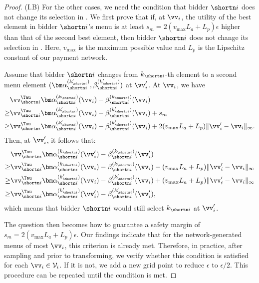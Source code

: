 \begin{proof}
(I.B) For the other cases, we need the condition that bidder $\shortn i$ does not change its selection in \neighbor. We first prove that if, at $\vv_i$, the utility of the best element in bidder $\shortn i$'s menu is at least $s_m=2(v_{\max}L_a + L_p)\epsilon$ higher than that of the second best element, then bidder $\shortn i$ does not change its selection in \neighbor. Here, $v_{\max}$ is the maximum possible value and $L_p$ is the Lipschitz constant of our payment network. 

Assume that bidder $\shortn i$ changes from $k_{\shortn i}$-th element to a second menu element $(\bm\alpha_{\shortn i}^{(k_{\shortn i}')}, \beta_{\shortn i}^{(k_{\shortn i}')})$ at $\vv_i'$. At $\vv_i$, we have
\begin{align}
    &\vv_{\shortn i}^\Tau \bm\alpha_{\shortn i}^{(k_{\shortn i})}(\vv_i) - \beta_{\shortn i}^{(k_{\shortn i})}(\vv_i) \nonumber\\
    \ge &\vv_{\shortn i}^\Tau \bm\alpha_{\shortn i}^{(k_{\shortn i}')}(\vv_i) - \beta_{\shortn i}^{(k_{\shortn i}')}(\vv_i) + s_m \\
    \ge &\vv_{\shortn i}^\Tau \bm\alpha_{\shortn i}^{(k_{\shortn i}')}(\vv_i) - \beta_{\shortn i}^{(k_{\shortn i}')}(\vv_i) + 2(v_{\max}L_a + L_p)\|\vv_i'-\vv_i\|_\infty.\label{equ:case22-1}\nonumber
\end{align}
Then, at $\vv_i'$, it follows that:
\begin{align}
    & \vv_{\shortn i}^\Tau \bm\alpha_{\shortn i}^{(k_{\shortn i})}(\vv_i') - \beta_{\shortn i}^{(k_{\shortn i})}(\vv_i') \\
    \ge & \vv_{\shortn i}^\Tau \bm\alpha_{\shortn i}^{(k_{\shortn i})}(\vv_i) - \beta_{\shortn i}^{(k_{\shortn i})}(\vv_i) - (v_{\max}L_a + L_p)\|\vv_i'-\vv_i\|_\infty\nonumber \\
    \ge & \vv_{\shortn i}^\Tau \bm\alpha_{\shortn i}^{(k_{\shortn i}')}(\vv_i) - \beta_{\shortn i}^{(k_{\shortn i}')}(\vv_i) + (v_{\max}L_a + L_p)\|\vv_i'-\vv_i\|_\infty\nonumber\\
    \ge & \vv_{\shortn i}^\Tau \bm\alpha_{\shortn i}^{(k_{\shortn i}')}(\vv_i') - \beta_{\shortn i}^{(k_{\shortn i}')}(\vv_i')\label{equ:case22-2},
\end{align}
which means that bidder $\shortn i$ would still select $k_{\shortn i}$ at $\vv_i'$. 

The question then becomes how to guarantee a safety margin of $s_m=2(v_{\max}L_a + L_p)\epsilon$. Our findings indicate that for the network-generated menus of most $\vv_i$, this criterion is already met. Therefore, in practice, after sampling and prior to transforming, we verify whether this condition is satisfied for each $\vv_i\in\mathcal{V}_i$. If it is not, we add a new grid point to reduce $\epsilon$ to $\epsilon/2$. This procedure can be repeated until the condition is met.


\end{proof}
